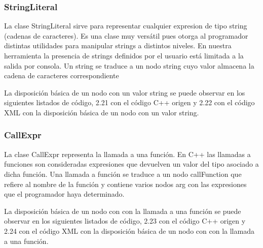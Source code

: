 \subsubsection*{StringLiteral}

La clase StringLiteral sirve para representar cualquier expresion de tipo string (cadenas de caracteres). Es una clase muy vers\'atil pues otorga al programador distintas utilidades para manipular strings a distintos niveles. En nuestra herramienta la presencia de strings definidos por el usuario est\'a limitada a la salida por consola. Un string se traduce a un nodo string cuyo valor almacena la cadena de caracteres correspondiente

La disposici\'on b\'asica de un nodo con un valor string se puede observar en los siguientes listados de c\'odigo, 2.21 con el c\'odigo C++ origen y 2.22 con el c\'odigo XML con la disposici\'on b\'asica de un nodo con un valor string.




\subsubsection*{CallExpr}

La clase CallExpr representa la llamada a una funci\'on. En C++ las llamadas a funciones son consideradas expresiones que devuelven un valor del tipo asociado a dicha funci\'on. Una llamada a funci\'on se traduce a un nodo callFunction que refiere al nombre de la funci\'on y contiene varios nodos arg con las expresiones que el programador haya determinado.

La disposici\'on b\'asica de un nodo con con la llamada a una funci\'on se puede observar en los siguientes listados de c\'odigo, 2.23 con el c\'odigo C++ origen y 2.24 con el c\'odigo XML con la disposici\'on b\'asica de un nodo con con la llamada a una funci\'on.




